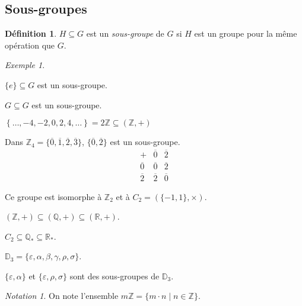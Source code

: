 \documentclass{report}
\newcommand*{\reels}{\mathbb{R}}
\newcommand*{\entiers}{\mathbb{Z}}
\newcommand*{\rationels}{\mathbb{Q}}
\theoremstyle{definition}
\newtheorem*{defin}{D\'efinition}
\theoremstyle{remark}
\newtheorem*{exem}{Exemple}
\newtheorem*{nota}{Notation}
\begin{document}
	\subsection{Sous-groupes}
	\begin{defin}
		$H \subseteq G$ est un \emph{sous-groupe} de $G$ si $H$ est un groupe pour la m\^eme op\'eration que $G$.
	\end{defin}
	\begin{exem}
		~

		\begin{ulist}
			\item $\{e\} \subseteq G$ est un sous-groupe.
			\item $G \subseteq G$ est un sous-groupe.
			\item $\left\lbrace \dotsc, -4, -2, 0, 2, 4, \dotsc \right\rbrace = 2\entiers \subseteq (\entiers,+)$
			\item Dans $\entiers_4 = \{\overline0, \overline1, \overline2, \overline3\}$, $\{\overline0, \overline2\}$ est un sous-groupe.
			\renewcommand{\arraystretch}{1.5}
			\[
			\begin{array}{c||c|c}
				+&\overline0&\overline2\\
				\hline\hline
				\overline0&\overline0&\overline2\\
				\hline
				\overline2&\overline2&\overline0
			\end{array}
			\]
			\renewcommand{\arraystretch}{1}

			Ce groupe est isomorphe \`a $\entiers_2$ et \`a $C_2=\left( \{-1,1\}, \times \right)$.
			\item $(\entiers,+) \subseteq (\rationels,+) \subseteq (\reels,+)$.
			\item $C_2 \subseteq \rationels_* \subseteq \reels_*$.
			\item $\mathbb{D}_3 = \{\varepsilon, \alpha, \beta, \gamma, \rho, \sigma\}$.

			$\{\varepsilon, \alpha\}$ et $\{\varepsilon, \rho, \sigma\}$ sont des sous-groupes de $\mathbb{D}_3$.
		\end{ulist}
		\begin{nota}
			On note l'ensemble $m\entiers = \{m \cdot n \mid n \in \entiers\}$.
		\end{nota}
	\end{exem}
\end{document}
